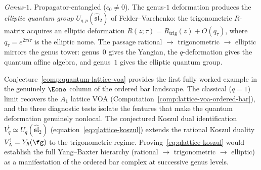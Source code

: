 \begin{conjecture}
\smallskip
\noindent
\emph{Genus-$1$.}
Propagator-entangled ($c_0 \ne 0$). The genus-$1$
deformation produces the \emph{elliptic quantum group}
$U_{q,p}(\widehat{\mathfrak{sl}}_2)$ of
Felder--Varchenko: the trigonometric $R$-matrix acquires
an elliptic deformation
$R(z;\tau) = R_{\mathrm{trig}}(z) + O(q_\tau)$,
where $q_\tau = e^{2\pi i \tau}$ is the elliptic nome.
The passage rational $\to$ trigonometric $\to$ elliptic
mirrors the genus tower: genus~$0$ gives the Yangian,
the $q$-deformation gives the quantum affine algebra,
and genus~$1$ gives the elliptic quantum group.
\ClaimStatusConjectured
\end{conjecture}

\begin{remark}%
\label{rem:e1-landscape-quantum}%
%
%
Conjecture~\ref{comp:quantum-lattice-voa} provides the
first fully worked example in the genuinely $\Eone$ column
of the ordered bar landscape. The classical ($q = 1$) limit
recovers the $A_1$ lattice VOA
(Computation~\ref{comp:lattice-voa-ordered-bar}), and the
three diagnostic tests isolate the features that make the
quantum deformation genuinely nonlocal. The conjectured
Koszul dual identification $V_q^! \simeq
U_q(\widehat{\mathfrak{sl}}_2)$ (equation~\eqref{eq:qlattice-koszul})
extends the rational Koszul duality
$V_\Lambda^! = Y_\hbar(\fg)$ to the trigonometric regime.
Proving~\eqref{eq:qlattice-koszul} would establish the
full Yang--Baxter hierarchy
(rational $\to$ trigonometric $\to$ elliptic) as a
manifestation of the ordered bar complex at successive
genus levels.
\end{remark}

